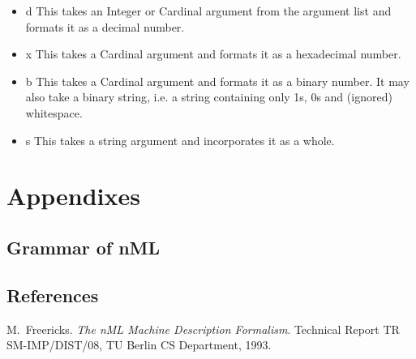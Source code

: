 \documentclass[oneside,final,14pt]{extreport}
\begin{document}
\begin{itemize}

\item  d This takes an Integer or Cardinal argument from the argument list and formats it as a
         decimal number.

\item  x This takes a Cardinal argument and formats it as a hexadecimal number.

\item  b This takes a Cardinal argument and formats it as a binary number. It may also take a
         binary string, i.e. a string containing only 1s, 0s and (ignored) whitespace.

\item  s This takes a string argument and incorporates it as a whole.

\end{itemize}


\chapter{Appendixes}

\section{Grammar of nML}

\section{References}

% 


\begin{thebibliography}{1}

M.~Freericks.
\emph{The nML Machine Description Formalism}.
Technical Report TR SM-IMP/DIST/08, TU Berlin CS Department, 1993.

\end{thebibliography}
\end{document}
